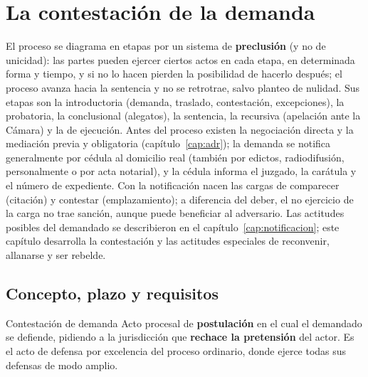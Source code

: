 \documentclass[12pt,oneside]{book}
\begin{document}
\chapter{La contestación de la demanda}
\label{cap:contestacion}

El proceso se diagrama en etapas por un sistema de \textbf{preclusión} (y no de unicidad): las partes pueden ejercer ciertos actos en cada etapa, en determinada forma y tiempo, y si no lo hacen pierden la posibilidad de hacerlo después; el proceso avanza hacia la sentencia y no se retrotrae, salvo planteo de nulidad. Sus etapas son la introductoria (demanda, traslado, contestación, excepciones), la probatoria, la conclusional (alegatos), la sentencia, la recursiva (apelación ante la Cámara) y la de ejecución. Antes del proceso existen la negociación directa y la mediación previa y obligatoria (capítulo~\ref{cap:adr}); la demanda se notifica generalmente por cédula al domicilio real (también por edictos, radiodifusión, personalmente o por acta notarial), y la cédula informa el juzgado, la carátula y el número de expediente. Con la notificación nacen las cargas de comparecer (citación) y contestar (emplazamiento); a diferencia del deber, el no ejercicio de la carga no trae sanción, aunque puede beneficiar al adversario. Las actitudes posibles del demandado se describieron en el capítulo~\ref{cap:notificacion}; este capítulo desarrolla la contestación y las actitudes especiales de reconvenir, allanarse y ser rebelde.

\section{Concepto, plazo y requisitos}

\begin{definition}{Contestación de demanda}
Acto procesal de \textbf{postulación} en el cual el demandado se defiende, pidiendo a la jurisdicción que \textbf{rechace la pretensión} del actor. Es el acto de defensa por excelencia del proceso ordinario, donde ejerce todas sus defensas de modo amplio.
\end{definition}
\end{document}

